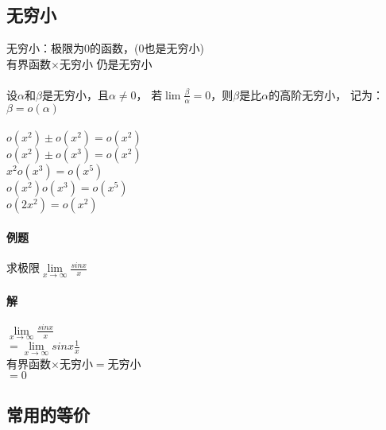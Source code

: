 \documentclass{article}
\begin{document}
\begin{flushleft}
	\section{无穷小}
	
	无穷小：极限为0的函数，(0也是无穷小)\\
	有界函数$\times$无穷小 仍是无穷小\\
	~\\
	设$\alpha$和$\beta$是无穷小，且$\alpha \neq 0$，
	若$\lim \frac{\beta}{\alpha}=0$，则$\beta$是比$\alpha$的高阶无穷小，
	记为：$\beta = o(\alpha)$\\
	~\\
	$o(x^2)\pm o(x^2)=o(x^2)$\\
	$o(x^2)\pm o(x^3)=o(x^2)$\\
	$x^2 o(x^3)=o(x^5)$\\
	$o(x^2) o(x^3)=o(x^5)$\\
	$o(2x^2)=o(x^2)$\\
	
	\paragraph{例题}
	求极限$\lim\limits_{x\to \infty}\frac{sinx}{x}$
	\paragraph{解}
	$\lim\limits_{x\to \infty}\frac{sinx}{x}$\\
	$=\lim\limits_{x\to \infty}sinx\frac{1}{x}$\\
	有界函数$\times$无穷小$=$无穷小\\
	$=0$\\
	
	\subsection{常用的等价}
	

\end{flushleft}
\end{document}

